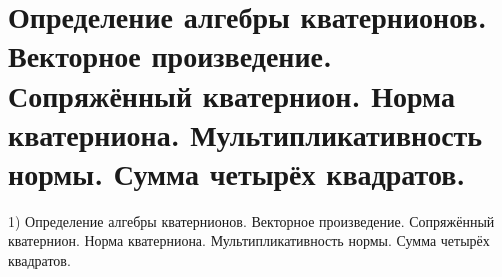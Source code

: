\section{
	 Определение алгебры кватернионов. Векторное произведение. Сопряжённый кватернион. Норма кватерниона. Мультипликативность нормы. Сумма четырёх квадратов.
}

1) Определение алгебры кватернионов. Векторное произведение. Сопряжённый кватернион. Норма кватерниона. Мультипликативность нормы. Сумма четырёх квадратов.
